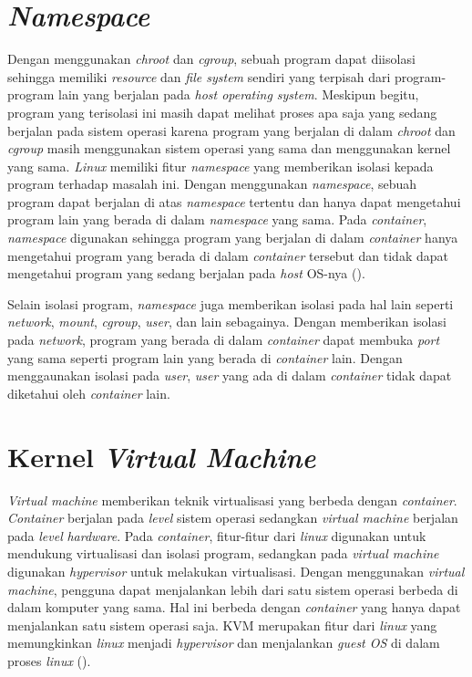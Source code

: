 \section{\textit{Namespace}}

\par Dengan menggunakan \textit{chroot} dan \textit{cgroup}, sebuah program dapat diisolasi sehingga memiliki \textit{resource} dan \textit{file system} sendiri yang terpisah dari program-program lain yang berjalan pada \textit{host operating system}. Meskipun begitu, program yang terisolasi ini masih dapat melihat proses apa saja yang sedang berjalan pada sistem operasi karena program yang berjalan di dalam \textit{chroot} dan \textit{cgroup} masih menggunakan sistem operasi yang sama dan menggunakan kernel yang sama. \textit{Linux} memiliki fitur \textit{namespace} yang memberikan isolasi kepada program terhadap masalah ini. Dengan menggunakan \textit{namespace}, sebuah program dapat berjalan di atas \textit{namespace} tertentu dan hanya dapat mengetahui program lain yang berada di dalam \textit{namespace} yang sama. Pada \textit{container}, \textit{namespace} digunakan sehingga program yang berjalan di dalam \textit{container} hanya mengetahui program yang berada di dalam \textit{container} tersebut dan tidak dapat mengetahui program yang sedang berjalan pada \textit{host} OS-nya (\cite{wfeltervmcontainer}).

\par Selain isolasi program, \textit{namespace} juga memberikan isolasi pada hal lain seperti \textit{network}, \textit{mount}, \textit{cgroup}, \textit{user}, dan lain sebagainya. Dengan memberikan isolasi pada \textit{network}, program yang berada di dalam \textit{container} dapat membuka \textit{port} yang sama seperti program lain yang berada di \textit{container} lain. Dengan menggaunakan isolasi pada \textit{user}, \textit{user} yang ada di dalam \textit{container} tidak dapat diketahui oleh \textit{container} lain.

\section{Kernel \textit{Virtual Machine}}

\par \textit{Virtual machine} memberikan teknik virtualisasi yang berbeda dengan \textit{container}. \textit{Container} berjalan pada \textit{level} sistem operasi sedangkan \textit{virtual machine} berjalan pada \textit{level} \textit{hardware}. Pada \textit{container}, fitur-fitur dari \textit{linux} digunakan untuk mendukung virtualisasi dan isolasi program, sedangkan pada \textit{virtual machine} digunakan \textit{hypervisor} untuk melakukan virtualisasi. Dengan menggunakan \textit{virtual machine}, pengguna dapat menjalankan lebih dari satu sistem operasi berbeda di dalam komputer yang sama. Hal ini berbeda dengan \textit{container} yang hanya dapat menjalankan satu sistem operasi saja. KVM merupakan fitur dari \textit{linux} yang memungkinkan \textit{linux} menjadi \textit{hypervisor} dan menjalankan \textit{guest OS} di dalam proses \textit{linux} (\cite{wfeltervmcontainer}).

